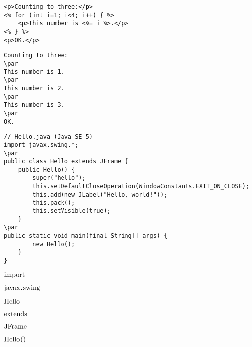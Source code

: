 \documentclass{book}
\def\lthtmlcheckvsize{\ifdim\ht\sizebox<\vsize 
  \ifdim\wd\sizebox<\hsize\expandafter\hfill\fi \expandafter\vfill
  \else\expandafter\vss\fi}%
\begin{document}
{\newpage\clearpage
{}%
\begin{lstlisting}
<p>Counting to three:</p>
<% for (int i=1; i<4; i++) { %>
    <p>This number is <%= i %>.</p>
<% } %>
<p>OK.</p>
\end{lstlisting}%
\lthtmlfigureZ
\lthtmlcheckvsize\clearpage}

{\newpage\clearpage
{}%
\begin{lstlisting}
Counting to three:
\par
This number is 1.
\par
This number is 2.
\par
This number is 3.
\par
OK.
\end{lstlisting}%
\lthtmlfigureZ
\lthtmlcheckvsize\clearpage}

{\newpage\clearpage
{}%
\begin{lstlisting}
// Hello.java (Java SE 5)
import javax.swing.*;
\par
public class Hello extends JFrame {
    public Hello() {
        super("hello");
        this.setDefaultCloseOperation(WindowConstants.EXIT_ON_CLOSE);
        this.add(new JLabel("Hello, world!"));
        this.pack();
        this.setVisible(true);
    }
\par
public static void main(final String[] args) {
        new Hello();
    }
}
\end{lstlisting}%
\lthtmlfigureZ
\lthtmlcheckvsize\clearpage}

{\newpage\clearpage
{}%
$\lstinline{import}$%
\lthtmlindisplaymathZ
\lthtmlcheckvsize\clearpage}

{\newpage\clearpage
{}%
$\lstinline{javax.swing}$%
\lthtmlindisplaymathZ
\lthtmlcheckvsize\clearpage}

{\newpage\clearpage
{}%
$\lstinline{Hello}$%
\lthtmlindisplaymathZ
\lthtmlcheckvsize\clearpage}

{\newpage\clearpage
{}%
$\lstinline{extends}$%
\lthtmlindisplaymathZ
\lthtmlcheckvsize\clearpage}

{\newpage\clearpage
{}%
$\lstinline{JFrame}$%
\lthtmlindisplaymathZ
\lthtmlcheckvsize\clearpage}

{\newpage\clearpage
{}%
$\lstinline{Hello()}$%
\lthtmlindisplaymathZ
\lthtmlcheckvsize\clearpage}
\end{document}
